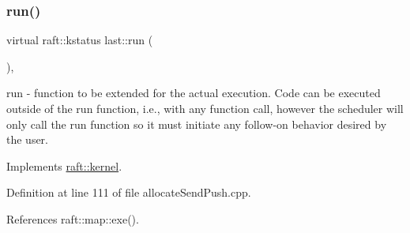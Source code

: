 \subsubsection{\texorpdfstring{run()}{run()}\hspace{0.1cm}{\footnotesize\ttfamily [4/6]}}
{\footnotesize\ttfamily virtual raft\+::kstatus last\+::run (\begin{DoxyParamCaption}{ }\end{DoxyParamCaption})\hspace{0.3cm}{\ttfamily [inline]}, {\ttfamily [virtual]}}

run -\/ function to be extended for the actual execution. Code can be executed outside of the run function, i.\+e., with any function call, however the scheduler will only call the run function so it must initiate any follow-\/on behavior desired by the user. 

Implements \hyperlink{classraft_1_1kernel_a05094286d7577360fb1b91c91fc05901}{raft\+::kernel}.



Definition at line 111 of file allocate\+Send\+Push.\+cpp.



References raft\+::map\+::exe().


